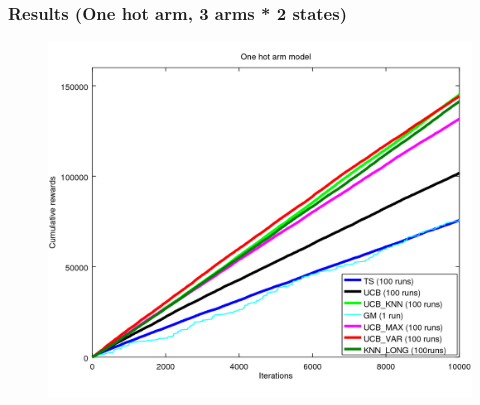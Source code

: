 \documentclass[french]{beamer}
\begin{document}
\begin{frame}
	\frametitle{Results (One hot arm, 3 arms * 2 states)}
	 
	\begin{figure}[h]
		\begin{center}
			\vspace{-10pt}
			\includegraphics[width=1.05\textheight]{all_10000it.png}
			
			\vspace{-10pt}
		\end{center}
	\end{figure}
\end{frame}
\end{document}
